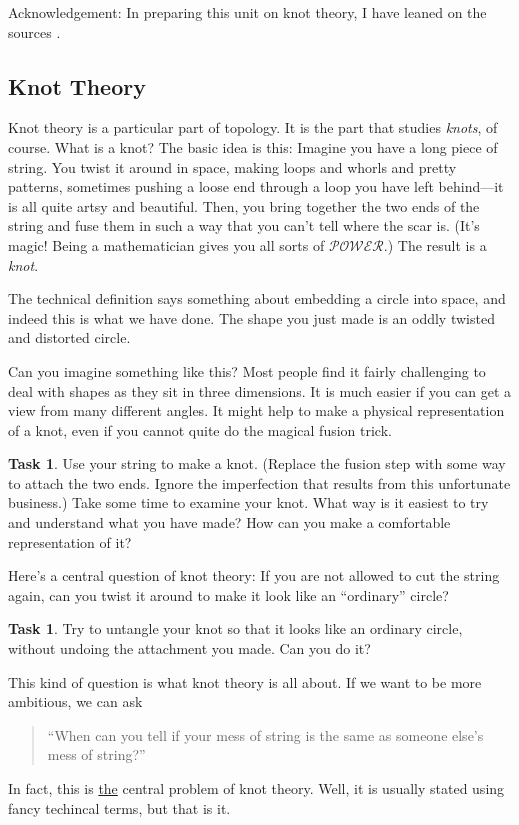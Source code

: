\documentclass[12pt,letterpaper]{article}
\theoremstyle{definition}
\newtheorem{task}[question]{Task}
\begin{document}
Acknowledgement: In preparing this unit on knot theory, I have leaned on the sources \cite{Adams, ArtOfMath:knots, knotinfo}.

\subsection*{Knot Theory}

Knot theory is a particular part of topology. 
It is the part that studies \emph{knots}, of course.
What is a knot?
The basic idea is this:
Imagine you have a long piece of string.
You twist it around in space, making loops and whorls and pretty patterns, sometimes pushing a loose end through a loop you have left behind---it is all quite artsy and beautiful.
Then, you bring together the two ends of the string and fuse them in such a way that you can't tell where the scar is.
(It's magic!
Being a mathematician gives you all sorts of 
$\mathcal{POWER}$.)
The result is a \emph{knot}.

The technical definition says something about embedding a circle into space, and indeed this is what we have done.
The shape you just made is an oddly twisted and distorted circle.

Can you imagine something like this?
Most people find it fairly challenging to deal with shapes as they sit in three dimensions.
It is much easier if you can get a view from many different angles.
It might help to make a physical representation of a knot, even if you cannot quite do the magical fusion trick.

\begin{task}
Use your string to make a knot.
(Replace the fusion step with some way to attach the two ends. 
Ignore the imperfection that results from this unfortunate business.)
Take some time to examine your knot.
What way is it easiest to try and understand what you have made?
How can you make a comfortable representation of it?
\end{task}

Here's a central question of knot theory: If you are not allowed to cut the string again, can you twist it around to make it look like an ``ordinary'' circle?

\begin{task}
Try to untangle your knot so that it looks like an ordinary circle, without undoing the attachment you made. Can you do it?
\end{task}

This kind of question is what knot theory is all about.
If we want to be more ambitious, we can ask
\begin{quote}
``When can you tell if your mess of string is the same as someone else's mess of string?''
\end{quote}
In fact, this is \underline{the} central problem of knot theory.
Well, it is usually stated using fancy techincal terms, but that is it.
\end{document}
